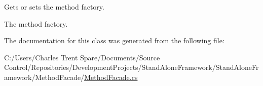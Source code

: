 Gets or sets the method factory. 

The method factory.

The documentation for this class was generated from the following file\+:\begin{DoxyCompactItemize}
\item 
C\+:/\+Users/\+Charles Trent Spare/\+Documents/\+Source Control/\+Repositories/\+Development\+Projects/\+Stand\+Alone\+Framework/\+Stand\+Alone\+Framework/\+Method\+Facade/\hyperlink{_method_facade_8cs}{Method\+Facade.\+cs}\end{DoxyCompactItemize}
